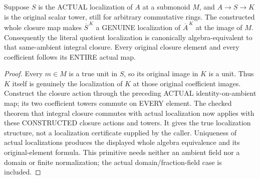 \begin{theorem}
\label{algebra:actual-integral-closure-localization}
Suppose $S$ is the ACTUAL localization of $A$ at a submonoid $M$,
and $A\to S\to K$ is the original scalar tower, still for
arbitrary commutative rings. The constructed whole closure map
makes $\overline S^{\,K}$ a GENUINE localization of
$\overline A^{\,K}$ at the image of $M$. Consequently the
literal quotient localization is canonically algebra-equivalent
to that same-ambient integral closure. Every original closure
element and every coefficient follows its ENTIRE actual map.
\leanok
\end{theorem}
\begin{proof}
Every $m\in M$ is a true unit in $S$, so its original image
in $K$ is a unit. Thus $K$ itself is genuinely the localization
of $K$ at those original coefficient images. Construct the
closure action through the preceding ACTUAL identity-on-ambient
map; its two coefficient towers commute on EVERY element.
The checked theorem that integral closure commutes with actual
localization now applies with these CONSTRUCTED closure actions
and towers. It gives the true localization structure, not a
localization certificate supplied by the caller. Uniqueness of
actual localizations produces the displayed whole algebra
equivalence and its original-element formula. This primitive
needs neither an ambient field nor a domain or finite
normalization; the actual domain/fraction-field case is included.
\end{proof}

